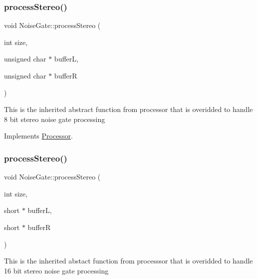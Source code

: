 \mbox{\label{classNoiseGate_ae8fb9a08e73fe9940c2c06c0c4613175}} 
\subsubsection{\texorpdfstring{process\+Stereo()}{processStereo()}\hspace{0.1cm}{\footnotesize\ttfamily [1/2]}}
{\footnotesize\ttfamily void Noise\+Gate\+::process\+Stereo (\begin{DoxyParamCaption}\item[{int}]{size,  }\item[{unsigned char $\ast$}]{bufferL,  }\item[{unsigned char $\ast$}]{bufferR }\end{DoxyParamCaption})\hspace{0.3cm}{\ttfamily [virtual]}}

This is the inherited abstract function from processor that is overidded to handle 8 bit stereo noise gate processing 

Implements \hyperlink{classProcessor_a9b3db1d1810308706285c3ffd1f6d28c}{Processor}.

\mbox{\label{classNoiseGate_ab1bf83dd8cf6f0438f204b90bfad2a00}} 
\subsubsection{\texorpdfstring{process\+Stereo()}{processStereo()}\hspace{0.1cm}{\footnotesize\ttfamily [2/2]}}
{\footnotesize\ttfamily void Noise\+Gate\+::process\+Stereo (\begin{DoxyParamCaption}\item[{int}]{size,  }\item[{short $\ast$}]{bufferL,  }\item[{short $\ast$}]{bufferR }\end{DoxyParamCaption})\hspace{0.3cm}{\ttfamily [virtual]}}

This is the inherited abstact function from processsor that is overidded to handle 16 bit stereo noise gate processing 

